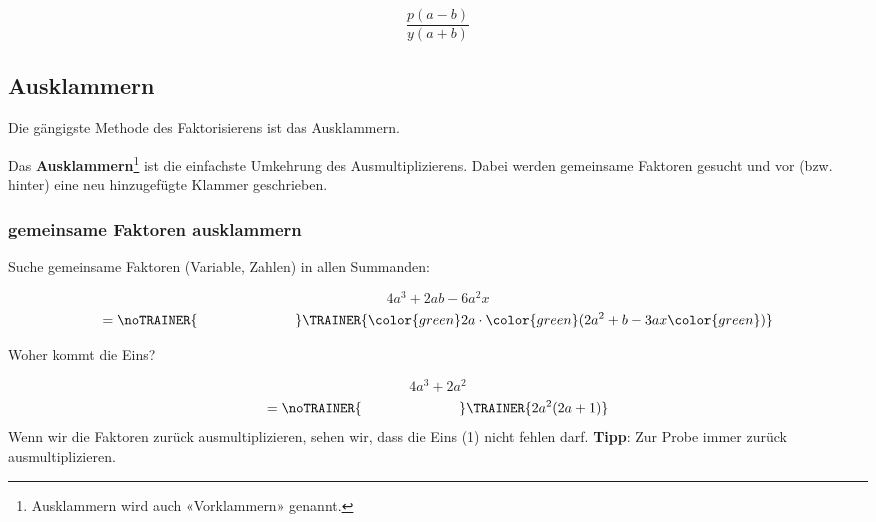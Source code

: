 $$\frac{p(a-b)}{y(a+b)}$$

\newpage

\subsection{Ausklammern}
Die gängigste Methode des Faktorisierens ist das Ausklammern.

Das \textbf{Ausklammern}\footnote{Ausklammern wird auch «Vorklammern» genannt.} ist die einfachste Umkehrung des Ausmultiplizierens.
Dabei werden gemeinsame Faktoren gesucht und vor (bzw. hinter) eine
neu hinzugefügte Klammer geschrieben.

\subsubsection{gemeinsame Faktoren ausklammern}
Suche gemeinsame Faktoren (Variable, Zahlen) in allen Summanden:

\begin{beispiel}{}{}
  $$4a^3 + 2ab -6a^2x$$
  $$=\noTRAINER{\hspace{7em}}\TRAINER{ {\color{green}2a}\cdot{\color{green}(}2a^2+b -3ax{\color{green})}}$$
\end{beispiel}

\begin{beispiel}{Woher kommt die Eins?}{}

$$4a^3 + 2a^2$$
$$=\noTRAINER{\hspace{7em}}\TRAINER{2a^2(2a + 1)}$$
Wenn wir die Faktoren zurück ausmultiplizieren, sehen wir, dass die
Eins (1) nicht fehlen darf. \textbf{Tipp}: Zur Probe immer zurück ausmultiplizieren.
\end{beispiel}




\newcommand{\olatAB}[2]{\subsection*{Aufgaben}
\aufgabenFarbe{OLAT #1. Aufg. #2}
\platzFuerBerechnungenBisEndeSeite{}}






